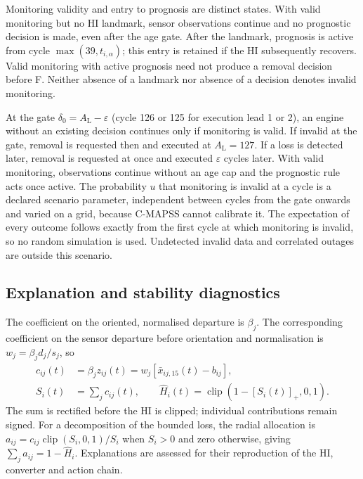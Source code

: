 \documentclass[preprint,12pt]{elsarticle}
\begin{document}
Monitoring validity and entry to prognosis are distinct states. With valid monitoring but no HI landmark, sensor observations continue and no prognostic decision is made, even after the age gate. After the landmark, prognosis is active from cycle $\max(39,t_{i,\alpha})$; this entry is retained if the HI subsequently recovers. Valid monitoring with active prognosis need not produce a removal decision before F. Neither absence of a landmark nor absence of a decision denotes invalid monitoring.

At the gate $\delta_0=A_{\mathrm L}-\varepsilon$ (cycle 126 or 125 for execution lead 1 or 2), an engine without an existing decision continues only if monitoring is valid. If invalid at the gate, removal is requested then and executed at $A_{\mathrm L}=127$. If a loss is detected later, removal is requested at once and executed $\varepsilon$ cycles later. With valid monitoring, observations continue without an age cap and the prognostic rule acts once active. The probability $u$ that monitoring is invalid at a cycle is a declared scenario parameter, independent between cycles from the gate onwards and varied on a grid, because C-MAPSS cannot calibrate it. The expectation of every outcome follows exactly from the first cycle at which monitoring is invalid, so no random simulation is used. Undetected invalid data and correlated outages are outside this scenario.



\subsection{Explanation and stability diagnostics}\label{sec:explanation-method}


The coefficient on the oriented, normalised departure is $\beta_j$. The corresponding coefficient on the sensor departure before orientation and normalisation is $w_j=\beta_jd_j/s_j$, so
\[
\begin{aligned}
c_{ij}(t)&=\beta_jz_{ij}(t)
 =w_j[\bar x_{ij,15}(t)-b_{ij}],\\
S_i(t)&=\sum_j c_{ij}(t),\qquad
\widehat H_i(t)=\operatorname{clip}(1-[S_i(t)]_+,0,1).
\end{aligned}
\]
The sum is rectified before the HI is clipped; individual contributions remain signed. For a decomposition of the bounded loss, the radial allocation is $a_{ij}=c_{ij}\operatorname{clip}(S_i,0,1)/S_i$ when $S_i>0$ and zero otherwise, giving $\sum_j a_{ij}=1-\widehat H_i$. Explanations are assessed for their reproduction of the HI, converter and action chain.
\end{document}
